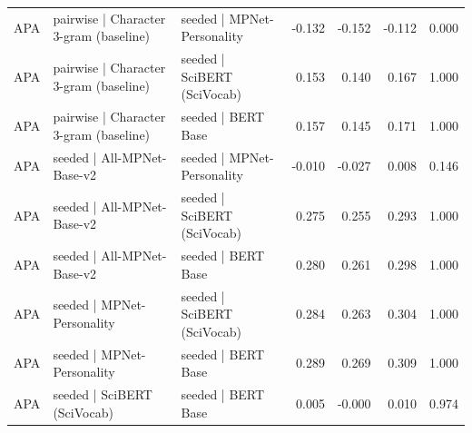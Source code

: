 \begin{table}[ht]
\begin{tabular}{lllrrrr}
APA & pairwise | Character 3-gram (baseline) & seeded | MPNet-Personality & -0.132 & -0.152 & -0.112 & 0.000 \\
APA & pairwise | Character 3-gram (baseline) & seeded | SciBERT (SciVocab) & 0.153 & 0.140 & 0.167 & 1.000 \\
APA & pairwise | Character 3-gram (baseline) & seeded | BERT Base & 0.157 & 0.145 & 0.171 & 1.000 \\
APA & seeded | All-MPNet-Base-v2 & seeded | MPNet-Personality & -0.010 & -0.027 & 0.008 & 0.146 \\
APA & seeded | All-MPNet-Base-v2 & seeded | SciBERT (SciVocab) & 0.275 & 0.255 & 0.293 & 1.000 \\
APA & seeded | All-MPNet-Base-v2 & seeded | BERT Base & 0.280 & 0.261 & 0.298 & 1.000 \\
APA & seeded | MPNet-Personality & seeded | SciBERT (SciVocab) & 0.284 & 0.263 & 0.304 & 1.000 \\
APA & seeded | MPNet-Personality & seeded | BERT Base & 0.289 & 0.269 & 0.309 & 1.000 \\
APA & seeded | SciBERT (SciVocab) & seeded | BERT Base & 0.005 & -0.000 & 0.010 & 0.974 \\
\bottomrule
\end{tabular}
\end{table}
